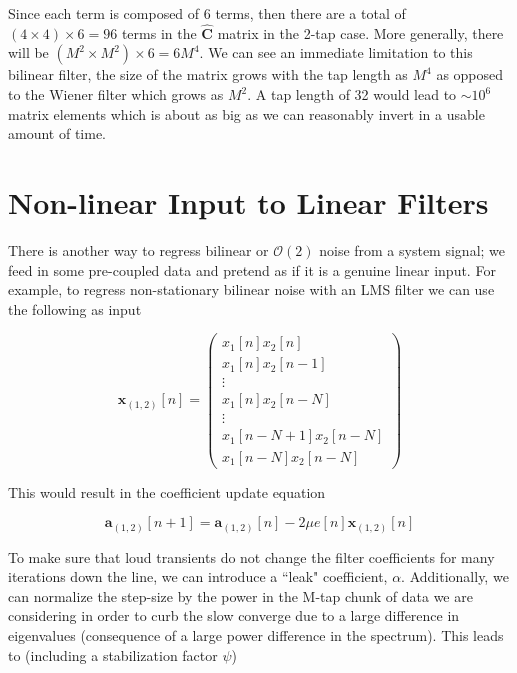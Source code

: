\documentclass{article}
\begin{document}
Since each term is composed of 6 terms, then there are a total of
$(4\times 4) \times 6 = 96$ terms in the $\hat{\mathbf{C}}$ matrix in the 2-tap
case. More generally, there will be $(M^2 \times M^2) \times 6 = 6M^4$.
We can see an immediate limitation to this bilinear filter, the
size of the matrix grows with the tap length as $M^4$ as opposed to
the Wiener filter which grows as $M^2$. A tap length of 32 would
lead to $\sim 10^6$ matrix elements which is about as big as we can
reasonably invert in a usable amount of time.

\section{Non-linear Input to Linear Filters}
There is another way to regress bilinear or $\mathcal{O}(2)$ noise from a system
signal; we feed in some pre-coupled data and pretend as if it is a genuine
linear input. For example, to regress non-stationary bilinear noise with an
LMS filter we can use the following as input

\begin{equation}
    \mathbf{x}_{(1,2)}[n]=
    \begin{pmatrix}
        x_1[n]x_2[n]\\
        x_1[n]x_2[n-1]\\
        \vdots\\
        x_1[n]x_2[n-N]\\
        \vdots\\
        x_1[n-N+1]x_2[n-N]\\
        x_1[n-N]x_2[n-N]
    \end{pmatrix}
\end{equation}

This would result in the coefficient update equation

\begin{equation}
    \mathbf{a}_{(1,2)}[n+1] = \mathbf{a}_{(1,2)}[n] -
    2\mu e[n]\mathbf{x}_{(1,2)}[n]
\end{equation}

To make sure that loud transients do not change the filter coefficients for
many iterations down the line, we can introduce a ``leak" coefficient, $\alpha$.
Additionally, we can normalize the step-size by the power in the M-tap chunk
of data we are considering in order to curb the slow converge due to a large
difference in eigenvalues (consequence of a large power difference in the
spectrum). This leads to (including a stabilization factor $\psi$)
\end{document}
